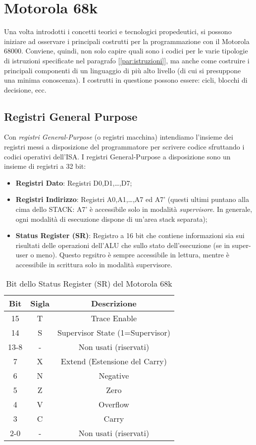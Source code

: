 \section{Motorola 68k}
Una volta introdotti i concetti teorici e tecnologici propedeutici, si possono iniziare ad osservare i principali costrutti per la programmazione con il Motorola 68000.
Conviene, quindi, non solo capire quali sono i  codici per le varie tipologie di istruzioni specificate nel paragrafo [\ref{par:istruzioni}], ma anche come costruire i principali componenti di un linguaggio di più alto livello (di cui si presuppone una minima conoscenza). I costrutti in questione possono essere: cicli, blocchi di decisione, ecc.

\subsection{Registri General Purpose}
Con \textit{registri General-Purpose} (o registri macchina) intendiamo l'insieme dei registri messi a disposizione del programmatore per scrivere codice sfruttando i codici operativi dell'ISA.
I registri General-Purpose a disposizione sono un insieme di registri a 32 bit:
\begin{itemize}
    \item \textbf{Registri Dato}: Registri D0,D1,\dots,D7;
    \item \textbf{Registri Indirizzo}: Registri A0,A1,\dots,A7 ed A7' (questi ultimi puntano alla cima dello STACK: A7' è accessibile solo in modalità \textit{supervisore}. In generale, ogni modalità di esecuzione dispone di un'area stack separata);
    \item \textbf{Status Register (SR)}: Registro a 16 bit che contiene informazioni sia sui risultati delle operazioni dell'ALU che sullo stato dell'esecuzione (se in super-user o meno). Questo regsitro è sempre accessibile in lettura, mentre è accessibile in scrittura solo in modalità supervisore.
\end{itemize}

\begin{table}[h!]
\centering
\renewcommand{\arraystretch}{1.2}
\begin{tabular}{|c|c|c|}
\hline
\textbf{Bit} & \textbf{Sigla} & \textbf{Descrizione} \\
\hline
15 & T & Trace Enable \\
\hline
14 & S & Supervisor State (1=Supervisor) \\
\hline
13-8 & - & Non usati (riservati) \\
\hline
7 & X & Extend (Estensione del Carry) \\
\hline
6 & N & Negative \\
\hline
5 & Z & Zero \\
\hline
4 & V & Overflow \\
\hline
3 & C & Carry \\
\hline
2-0 & - & Non usati (riservati) \\
\hline
\end{tabular}
\caption{Bit dello Status Register (SR) del Motorola 68k}
\label{table:SR68k}
\end{table}


